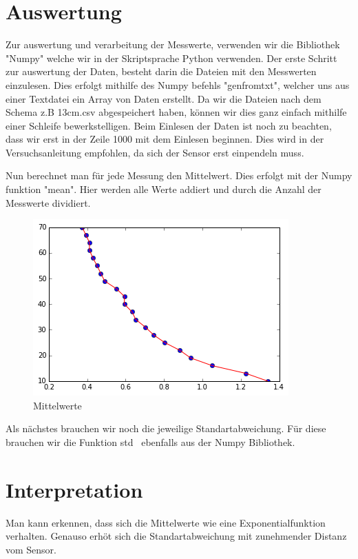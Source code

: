 \documentclass[TGAI_Laborbericht.tex]{subfiles}
\begin{document}
\section{Auswertung}
\label{chap:VERSUCH_1_AUSWERTUNG}
\begin{flushleft}
Zur auswertung und verarbeitung der Messwerte, verwenden wir die Bibliothek "Numpy" welche wir in der Skriptsprache Python verwenden. Der erste Schritt zur auswertung der Daten, besteht darin die Dateien mit den Messwerten einzulesen. Dies erfolgt mithilfe des Numpy befehls "genfromtxt", welcher uns aus einer Textdatei ein Array von Daten erstellt. Da wir die Dateien nach dem Schema z.B 13cm.csv abgespeichert haben, können wir dies ganz einfach mithilfe einer Schleife bewerkstelligen. Beim Einlesen der Daten ist noch zu beachten, dass wir erst in der Zeile 1000 mit dem Einlesen beginnen. Dies wird in der Versuchsanleitung empfohlen, da sich der Sensor erst einpendeln muss. 

Nun berechnet man für jede Messung den Mittelwert. Dies erfolgt mit der Numpy funktion "mean". Hier werden alle Werte addiert und durch die Anzahl der Messwerte dividiert.
\begin{figure}[H]
\includegraphics[]{media/messwerte.png}
\caption{Mittelwerte}
\end{figure}
Als nächstes brauchen wir noch die jeweilige Standartabweichung. Für diese brauchen wir die Funktion \dq std\dq ~ ebenfalls aus der Numpy Bibliothek.
\end{flushleft}

\section{Interpretation}
\label{chap:VERSUCH_1_INTERPRETATION}
Man kann erkennen, dass sich die Mittelwerte wie eine Exponentialfunktion verhalten. Genauso erhöt sich die Standartabweichung mit zunehmender Distanz vom Sensor.
\end{document}
